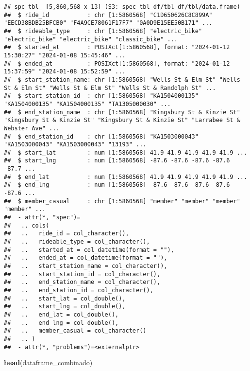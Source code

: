 \documentclass[
]{article}
\newenvironment{Shaded}{\begin{snugshade}}{\end{snugshade}}
\newcommand{\FunctionTok}[1]{\textcolor[rgb]{0.13,0.29,0.53}{\textbf{#1}}}
\newcommand{\NormalTok}[1]{#1}
\begin{document}
\begin{verbatim}
## spc_tbl_ [5,860,568 x 13] (S3: spec_tbl_df/tbl_df/tbl/data.frame)
##  $ ride_id           : chr [1:5860568] "C1D650626C8C899A" "EECD38BDB25BFCB0" "F4A9CE78061F17F7" "0A0D9E15EE50B171" ...
##  $ rideable_type     : chr [1:5860568] "electric_bike" "electric_bike" "electric_bike" "classic_bike" ...
##  $ started_at        : POSIXct[1:5860568], format: "2024-01-12 15:30:27" "2024-01-08 15:45:46" ...
##  $ ended_at          : POSIXct[1:5860568], format: "2024-01-12 15:37:59" "2024-01-08 15:52:59" ...
##  $ start_station_name: chr [1:5860568] "Wells St & Elm St" "Wells St & Elm St" "Wells St & Elm St" "Wells St & Randolph St" ...
##  $ start_station_id  : chr [1:5860568] "KA1504000135" "KA1504000135" "KA1504000135" "TA1305000030" ...
##  $ end_station_name  : chr [1:5860568] "Kingsbury St & Kinzie St" "Kingsbury St & Kinzie St" "Kingsbury St & Kinzie St" "Larrabee St & Webster Ave" ...
##  $ end_station_id    : chr [1:5860568] "KA1503000043" "KA1503000043" "KA1503000043" "13193" ...
##  $ start_lat         : num [1:5860568] 41.9 41.9 41.9 41.9 41.9 ...
##  $ start_lng         : num [1:5860568] -87.6 -87.6 -87.6 -87.6 -87.7 ...
##  $ end_lat           : num [1:5860568] 41.9 41.9 41.9 41.9 41.9 ...
##  $ end_lng           : num [1:5860568] -87.6 -87.6 -87.6 -87.6 -87.6 ...
##  $ member_casual     : chr [1:5860568] "member" "member" "member" "member" ...
##  - attr(*, "spec")=
##   .. cols(
##   ..   ride_id = col_character(),
##   ..   rideable_type = col_character(),
##   ..   started_at = col_datetime(format = ""),
##   ..   ended_at = col_datetime(format = ""),
##   ..   start_station_name = col_character(),
##   ..   start_station_id = col_character(),
##   ..   end_station_name = col_character(),
##   ..   end_station_id = col_character(),
##   ..   start_lat = col_double(),
##   ..   start_lng = col_double(),
##   ..   end_lat = col_double(),
##   ..   end_lng = col_double(),
##   ..   member_casual = col_character()
##   .. )
##  - attr(*, "problems")=<externalptr>
\end{verbatim}

\begin{Shaded}
\begin{Highlighting}[]
\FunctionTok{head}\NormalTok{(dataframe\_combinado)}
\end{Highlighting}
\end{Shaded}
\end{document}
